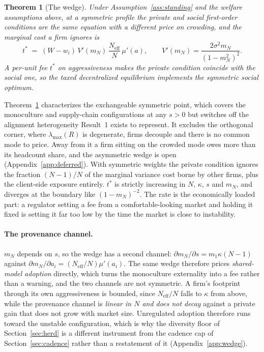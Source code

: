 \documentclass{article}
\theoremstyle{plain}
\newtheorem{theorem}{Theorem}
\theoremstyle{definition}
\newcommand{\Neff}{N_{\mathrm{eff}}}
\newcommand{\mN}{m_N}
\newcommand{\lmax}{\lambda_{\max}}
\begin{document}
\begin{theorem}[The wedge]
\label{thm:wedge}
Under Assumption~\ref{ass:standing} and the welfare assumptions above, at a symmetric profile the private and social first-order conditions are the same equation with a different price on crowding, and the marginal cost a firm ignores is
\begin{equation}
t^{*} \;=\; (W - w_i)\, V'(\mN)\, \frac{\Neff}{N}\, \mu'(a), \qquad V'(\mN) = \frac{2\sigma^2 \mN}{(1-\mN^2)^2}.
\end{equation}
A per-unit fee $t^{*}$ on aggressiveness makes the private condition coincide with the social one, so the taxed decentralized equilibrium implements the symmetric social optimum.
\end{theorem}

Theorem~\ref{thm:wedge} characterizes the exchangeable symmetric point, which covers the monoculture and supply-chain configurations at any $s>0$ but switches off the alignment heterogeneity Result~1 exists to represent. It excludes the orthogonal corner, where $\lmax(R)$ is degenerate, firms decouple and there is no common mode to price. Away from it a firm sitting on the crowded mode owes more than its headcount share, and the asymmetric wedge is open (Appendix~\ref{app:deferred}). With symmetric weights the private condition ignores the fraction $(N-1)/N$ of the marginal variance cost borne by other firms, plus the client-side exposure entirely. $t^{*}$ is strictly increasing in $N$, $\kappa$, $s$ and $\mN$, and diverges at the boundary like $(1-\mN)^{-2}$. The rate is the economically loaded part: a regulator setting a fee from a comfortable-looking market and holding it fixed is setting it far too low by the time the market is close to instability.

\paragraph{The provenance channel.}
$\mN$ depends on $s$, so the wedge has a second channel: $\partial \mN/\partial s = m_1\kappa(N-1)$ against $\partial\mN/\partial a_i = (\Neff/N)\mu'(a_i)$. The same wedge therefore prices \emph{shared-model adoption} directly, which turns the monoculture externality into a fee rather than a warning, and the two channels are not symmetric. A firm's footprint through its own aggressiveness is bounded, since $\Neff/N$ falls to $\kappa$ from above, while the provenance channel is \emph{linear in $N$ and does not decay} against a private gain that does not grow with market size. Unregulated adoption therefore runs toward the unstable configuration, which is why the diversity floor of Section~\ref{sec:herd} is a different instrument from the cadence cap of Section~\ref{sec:cadence} rather than a restatement of it (Appendix~\ref{app:wedge}).
\end{document}
